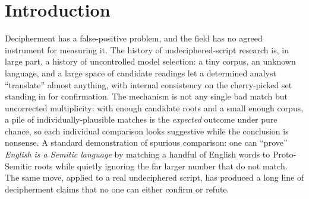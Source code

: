 \begin{abstract}
Decipherment research has a false-positive problem and no shared
instrument: a small corpus, an unknown language, and many candidate
readings let an analyst ``translate'' almost anything. The flagship
survey lists fifteen challenges of script and data; none addresses the
orthogonal inference-control layer --- overfitting, multiple testing,
contamination --- a candidate sixteenth challenge. We build a
falsification-first framework for it: a fabricated-language
negative-control family, multiple-comparison deflation, a literature
index separating published from not-indexed signs, and pre-registration
with a mechanically-graded gate. This is a methods paper; we assert no
decipherment. The machinery calibrates: on a tested null the gate's
false-graduation rate is 0.6\% (3/500); the identical morphology test
finding no power on Linear A recovers Mycenaean (Linear B) inflection
(9/16 affixes above the bigram floor), supporting the interpretation
that Linear A's short forms contribute materially to its lack of power.
Across probes it returns differentiated, calibrated outcomes --- null,
no-power, supported-structural, circular, and contamination-sensitive.
Results are consistent with identifiability, rather than corpus size,
being the more fundamental present constraint. The June-2026 *301
``cracked'' claim is a qualitative illustration of the failure modes the
gate is designed to detect.
\end{abstract}

\section{Introduction}

Decipherment has a false-positive problem, and the field has no agreed
instrument for measuring it. The history of undeciphered-script research
is, in large part, a history of uncontrolled model selection: a tiny
corpus, an unknown language, and a large space of candidate readings let
a determined analyst ``translate'' almost anything, with internal
consistency on the cherry-picked set standing in for confirmation. The
mechanism is not any single bad match but uncorrected multiplicity: with
enough candidate roots and a small enough corpus, a pile of
individually-plausible matches is the \emph{expected} outcome under pure
chance, so each individual comparison looks suggestive while the
conclusion is nonsense. A standard demonstration of spurious
comparison: one can ``prove'' \emph{English is a Semitic language} by
matching a handful of English words to Proto-Semitic roots while quietly
ignoring the far larger number that do not match. The same move, applied
to a real undeciphered script, has produced a long line of decipherment
claims that no one can either confirm or refute.

